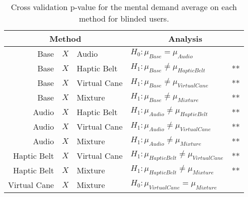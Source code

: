 
\begin{table}[!htb]
\centering
\caption{Cross validation p-value for the mental demand average on each method for blinded users.}
\label{tab:lsd_md_avg_two_way_blind}
\begin{tabular}{rcllr}
\toprule
      \multicolumn{3}{c}{Method} &                          \multicolumn{2}{c}{Analysis} \\
\midrule
              Base & $X$ & Audio &                   $H_0 : \mu_{Base} = \mu_{Audio}$ &  \\
        Base & $X$ & Haptic Belt &         $H_1 : \mu_{Base} \ne \mu_{Haptic Belt}$ & ** \\
       Base & $X$ & Virtual Cane &        $H_1 : \mu_{Base} \ne \mu_{Virtual Cane}$ & ** \\
            Base & $X$ & Mixture &             $H_1 : \mu_{Base} \ne \mu_{Mixture}$ & ** \\
       Audio & $X$ & Haptic Belt &        $H_1 : \mu_{Audio} \ne \mu_{Haptic Belt}$ & ** \\
      Audio & $X$ & Virtual Cane &       $H_1 : \mu_{Audio} \ne \mu_{Virtual Cane}$ & ** \\
           Audio & $X$ & Mixture &            $H_1 : \mu_{Audio} \ne \mu_{Mixture}$ & ** \\
Haptic Belt & $X$ & Virtual Cane & $H_1 : \mu_{Haptic Belt} \ne \mu_{Virtual Cane}$ & ** \\
     Haptic Belt & $X$ & Mixture &      $H_1 : \mu_{Haptic Belt} \ne \mu_{Mixture}$ & ** \\
    Virtual Cane & $X$ & Mixture &         $H_0 : \mu_{Virtual Cane} = \mu_{Mixture}$ &  \\
\bottomrule
\end{tabular}
\end{table}

